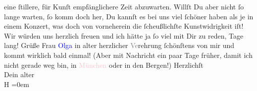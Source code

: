                eine ſtillere, für Kunſt empfänglichere Zeit abzuwarten. Willſt Du aber nicht ſo
               lange warten, ſo komm doch her, Du kannſt es bei uns viel ſchöner haben als je in
               einem Konzert, was doch von vorneherein die ſcheußlichſte Kunstwidrigkeit iſt! Wir
               würden uns herzlich freuen und ich hätte ja ſo viel mit Dir zu reden, Tage lang!\pend
           \pstart
           Grüße Frau \textcolor{blue}{Olga}{}\ledrightnote{\textcolor{blue}{Olga Schnitzler}} in alter herzlicher
                  \textcolor{gray}{Ve}rehrung ſchönſtens von mir und kommt wirklich bald einmal!
               (Aber mit Nachricht ein paar Tage früher, damit ich nicht gerade weg bin, in \textcolor{pink}{München}{}\ledrightnote{\textcolor{pink}{München}} oder in den Bergen!)\pend
           \pstart
           Herzlichſt{\\[\baselineskip]}Dein alter{\\[\baselineskip]}\spacefill\mbox{H}\pend
           \leftskip=0em{}\endnumbering{}  
      